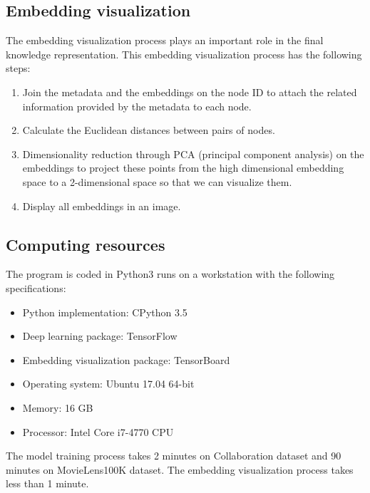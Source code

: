\documentclass[conference]{IEEEtran}
\begin{document}
\subsection{Embedding visualization}
The embedding visualization process plays an important role in the final knowledge representation.
This embedding visualization process has the following steps:
\begin{enumerate}
	\item Join the metadata and the embeddings on the node ID to attach the related information provided by the metadata to each node.
	\item Calculate the Euclidean distances between pairs of nodes.
	\item Dimensionality reduction through PCA (principal component analysis) on the embeddings to project these points from the high dimensional embedding space to a 2-dimensional space so that we can visualize them.
	\item Display all embeddings in an image.
\end{enumerate}

\subsection{Computing resources}
The program is coded in Python3 runs on a workstation with the following specifications:
\begin{itemize}
	\item Python implementation: CPython 3.5
	\item Deep learning package: TensorFlow \cite{abadi2016tensorflow}
	\item Embedding visualization package: TensorBoard \cite{abadi2016tensorflow}
	\item Operating system: Ubuntu 17.04 64-bit
	\item Memory: 16 GB
	\item Processor: Intel Core i7-4770 CPU
\end{itemize}
The model training process takes 2 minutes on Collaboration dataset and 90 minutes on MovieLens100K dataset. The embedding visualization process takes less than 1 minute.
\end{document}
